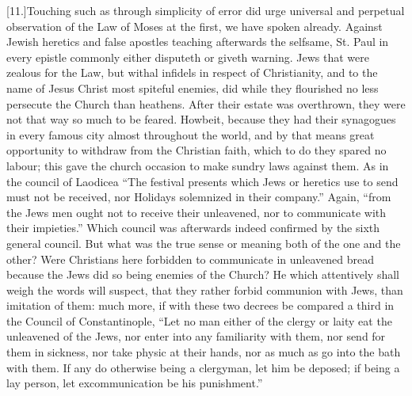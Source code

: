 [11.]Touching such as through simplicity of error did urge universal and perpetual observation of the Law of Moses at the first, we have spoken already. Against Jewish heretics and false apostles teaching afterwards the selfsame, St. Paul in every epistle commonly either disputeth or giveth warning. Jews that were zealous for the Law, but withal infidels in respect of Christianity, and to the name of Jesus Christ most spiteful enemies, did while they flourished no less persecute the Church than heathens. After their estate was overthrown, they were not that way so much to be feared. Howbeit, because they had their synagogues in every famous city almost throughout the world, and by that means great opportunity to withdraw from the Christian faith, which to do they spared no labour; this gave the church occasion to make sundry laws against them. As in the council of Laodicea  “The festival presents which Jews or heretics use to send must not be received, nor Holidays solemnized in their company.” Again, “from the Jews men ought not to receive their unleavened, nor to communicate with their impieties.” Which council was afterwards indeed confirmed by the sixth general council. But what was the true sense or meaning both of the one and the other? Were Christians here forbidden to communicate in unleavened bread because the Jews did so being enemies of the Church? He which attentively shall weigh the words will suspect, that they rather forbid communion with Jews, than imitation of them: much more, if with these two decrees be compared a third in the Council of Constantinople, “Let no man either of the clergy or laity eat the unleavened of the Jews, nor enter into any familiarity with them, nor send for them in sickness, nor take physic at their hands, nor as much as go into the bath with them. If any do otherwise being a clergyman, let him be deposed; if being a lay person, let excommunication be his punishment.”

